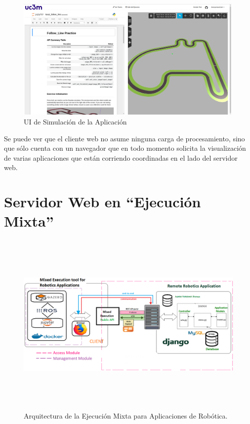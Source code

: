 \begin{figure}[!hbtp]  \centering\noindent
    \includegraphics[width=0.99\textwidth]{figures/ui_simulation.png}
    \caption{UI de Simulación de la Aplicación}
    \label{simui}
\end{figure}

Se puede ver que el cliente web no asume ninguna carga de procesamiento, sino que sólo cuenta con un navegador que en todo momento solicita la visualización de varias aplicaciones que están corriendo coordinadas en el lado del servidor web.

\section{Servidor Web en ``Ejecución Mixta''}

\begin{figure}[!ht]  \centering\noindent
    \includegraphics[width=1.05\textwidth,height=9cm]{figures/ejecucion-mixta-infograma.png}
    \caption{Arquitectura de la Ejecución Mixta para Aplicaciones de Robótica.}
    \label{mixedexecarch}
\end{figure}

